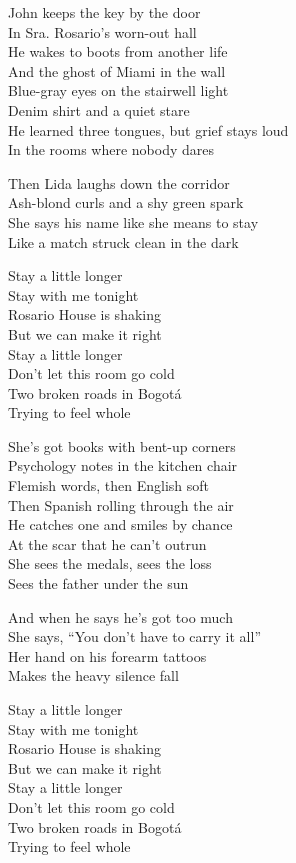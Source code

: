 \begin{lyrics}
John keeps the key by the door\\
In Sra. Rosario’s worn-out hall\\
He wakes to boots from another life\\
And the ghost of Miami in the wall\\
Blue-gray eyes on the stairwell light\\
Denim shirt and a quiet stare\\
He learned three tongues, but grief stays loud\\
In the rooms where nobody dares

Then Lida laughs down the corridor\\
Ash-blond curls and a shy green spark\\
She says his name like she means to stay\\
Like a match struck clean in the dark

Stay a little longer\\
Stay with me tonight\\
Rosario House is shaking\\
But we can make it right\\
Stay a little longer\\
Don’t let this room go cold\\
Two broken roads in Bogotá\\
Trying to feel whole

She’s got books with bent-up corners\\
Psychology notes in the kitchen chair\\
Flemish words, then English soft\\
Then Spanish rolling through the air\\
He catches one and smiles by chance\\
At the scar that he can’t outrun\\
She sees the medals, sees the loss\\
Sees the father under the sun

And when he says he’s got too much\\
She says, “You don’t have to carry it all”\\
Her hand on his forearm tattoos\\
Makes the heavy silence fall

Stay a little longer\\
Stay with me tonight\\
Rosario House is shaking\\
But we can make it right\\
Stay a little longer\\
Don’t let this room go cold\\
Two broken roads in Bogotá\\
Trying to feel whole


\end{lyrics}
